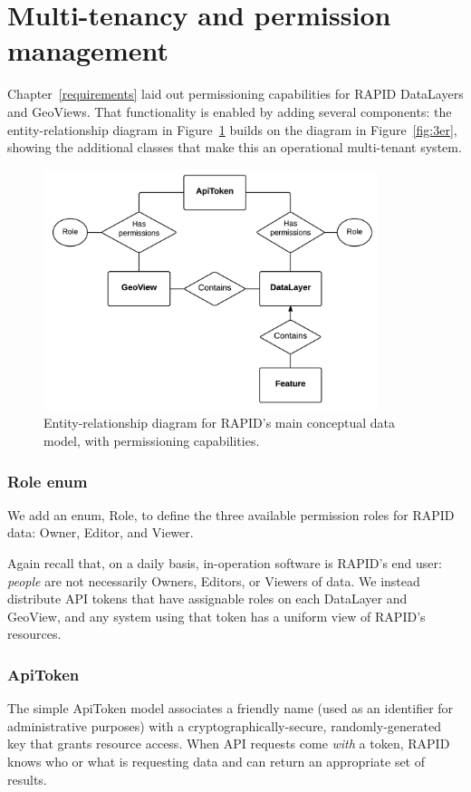 
\section{Multi-tenancy and permission management}
Chapter~\ref{requirements} laid out permissioning capabilities for RAPID DataLayers and GeoViews. That functionality is enabled by adding several components: the entity-relationship diagram in Figure~\ref{fig:er} builds on the diagram in Figure~\ref{fig:3er}, showing the additional classes that make this an operational multi-tenant system.

\begin{figure}[ht]
    \centering
    \includegraphics[width=0.87\textwidth]{figures/er.png}
    \caption{Entity-relationship diagram for RAPID's main conceptual data model, with permissioning capabilities.}
    \label{fig:er}
\end{figure}

\subsubsection{Role enum}
We add an enum, Role, to define the three available permission roles for RAPID data: Owner, Editor, and Viewer.

Again recall that, on a daily basis, in-operation software is RAPID's end user: \textit{people} are not necessarily Owners, Editors, or Viewers of data. We instead distribute API tokens that have assignable roles on each DataLayer and GeoView, and any system using that token has a uniform view of RAPID's resources.

\subsubsection{ApiToken}
The simple ApiToken model associates a friendly name (used as an identifier for administrative purposes) with a cryptographically-secure, randomly-generated key that grants resource access. When API requests come \textit{with} a token, RAPID knows who or what is requesting data and can return an appropriate set of results.


